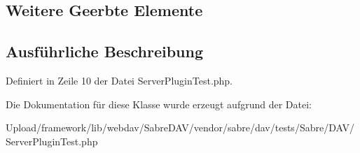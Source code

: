 \subsection*{Weitere Geerbte Elemente}


\subsection{Ausführliche Beschreibung}


Definiert in Zeile 10 der Datei Server\+Plugin\+Test.\+php.



Die Dokumentation für diese Klasse wurde erzeugt aufgrund der Datei\+:\begin{DoxyCompactItemize}
\item 
Upload/framework/lib/webdav/\+Sabre\+D\+A\+V/vendor/sabre/dav/tests/\+Sabre/\+D\+A\+V/Server\+Plugin\+Test.\+php\end{DoxyCompactItemize}
